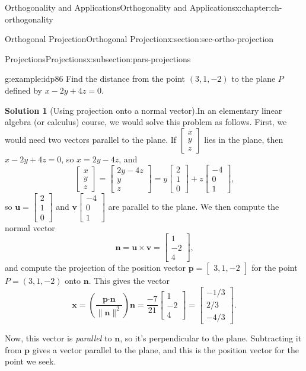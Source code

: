 \documentclass[oneside,10pt,]{book}
\newcommand{\blocktitlefont}{\relax}
\numberwithin{equation}{section}
\newcommand{\bbm}{\begin{bmatrix}}
\newcommand{\ebm}{\end{bmatrix}}
\newcommand{\dotp}{\!\boldsymbol{\cdot}\!}
\newcommand{\len}[1]{\lVert #1\rVert}
\newcommand{\uu}{\mathbf{u}}
\newcommand{\vv}{\mathbf{v}}
\newcommand{\xx}{\mathbf{x}}
\begin{document}
\begin{chapterptx}{Orthogonality and Applications}{}{Orthogonality and Applications}{}{}{x:chapter:ch-orthogonality}
\begin{sectionptx}{Orthogonal Projection}{}{Orthogonal Projection}{}{}{x:section:sec-ortho-projection}
\begin{subsectionptx}{Projections}{}{Projections}{}{}{x:subsection:pars-projections}
\begin{example}{}{g:example:idp86}%
Find the distance from the point \((3,1,-2)\) to the plane \(P\) defined by \(x-2y+4z=0\).%
\par\smallskip%
\noindent\textbf{\blocktitlefont Solution 1} (Using projection onto a normal vector).\hypertarget{g:solution:idp87}{}\quad{}In an elementary linear algebra (or calculus) course, we would solve this problem as follows. First, we would need two vectors parallel to the plane. If \(\bbm x\\y\\z\ebm\) lies in the plane, then \(x-2y+4z=0\), so \(x=2y-4z\), and%
\begin{equation*}
\bbm x\\y\\z\ebm = \bbm 2y-4z\\y\\z\ebm = y\bbm 2\\1\\0\ebm + z\bbm -4\\0\\1\ebm\text{,}
\end{equation*}
so \(\uu=\bbm 2\\1\\0\ebm\) and \(\vv\bbm -4\\0\\1\ebm\) are parallel to the plane. We then compute the normal vector%
\begin{equation*}
\mathbf{n}=\uu\times\vv=\bbm 1\\-2\\4\ebm\text{,}
\end{equation*}
and compute the projection of the position vector \(\mathbf{p}=\bbm 3,1,-2\ebm\) for the point \(P=(3,1,-2)\) onto \(\mathbf{n}\). This gives the vector%
\begin{equation*}
\xx = \left(\frac{\mathbf{p}\dotp\mathbf{n}}{\len{\mathbf{n}}^2}\right)\mathbf{n} = \frac{-7}{21}\bbm 1\\-2\\4\ebm =\bbm-1/3\\2/3\\-4/3\ebm\text{.}
\end{equation*}
%
\par
Now, this vector is \emph{parallel} to \(\mathbf{n}\), so it's perpendicular to the plane. Subtracting it from \(\mathbf{p}\) gives a vector parallel to the plane, and this is the position vector for the point we seek.%
\begin{equation*}

\end{equation*}
\end{example}
\end{subsectionptx}
\end{sectionptx}
\end{chapterptx}
\end{document}
